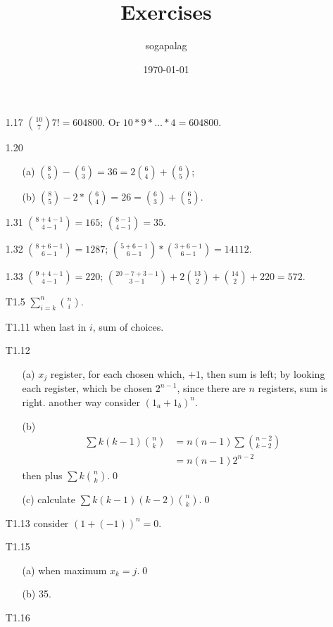 \documentclass[paper=a4, fontsize=11pt]{scrartcl} %
\title{Exercises}
\author{sogapalag}
\date{\normalsize\today}
\numberwithin{equation}{section} %
\numberwithin{figure}{section} %
\numberwithin{table}{section} %
\begin{document}
\maketitle
\begin{itemize}
	\item[1.17] ${10 \choose 7} 7! = 604800$. Or $10*9*\dots*4 = 604800$.
	\item[1.20] 
	\begin{itemize}
		\item[(a)] ${8\choose 5} - {6\choose 3} =36= 2{6\choose 4}+{6\choose 5}$; 
		\item[(b)] ${8\choose 5} - 2*{6\choose 4} =26= {6\choose 3} + {6\choose 5}$.
	\end{itemize}
	\item[1.31] ${8+4-1\choose 4-1} = 165$; ${8-1\choose 4-1}=35$.
	\item[1.32] ${8+6-1 \choose 6-1} = 1287$; ${5+6-1 \choose 6-1}*{3+6-1 \choose 6-1} = 14112$.
	\item[1.33] ${9+4-1 \choose 4-1} = 220$; ${20-7+3-1 \choose 3-1} +2{13\choose 2} +{14\choose 2} +220 = 572$.
	\item[T1.5] $\sum_{i=k}^n {n\choose i}$.
	\item[T1.11] when last in $i$, sum of choices.
	\item[T1.12]
	\begin{itemize}
		\item[(a)] $x_j$ register, for each chosen which, $+1$, then sum is left; by looking each register, which be chosen $2^{n-1}$, since there are $n$ registers, sum is right. another way consider $(1_a+1_b)^n$.
		\item[(b)]
		\begin{align}
			\sum k (k-1) {n\choose k } &= n(n-1) \sum {n-2 \choose k-2}\\
			&= n(n-1)2^{n-2}
		\end{align}
		then plus $\sum k{n\choose k}$.\qed
		\item[(c)] calculate $\sum k(k-1)(k-2){n\choose k}$.\qed
	\end{itemize}
	\item[T1.13] consider $(1+(-1))^n=0$.
	\item[T1.15]
	\begin{itemize}
		\item[(a)] when maximum $x_k = j$.\qed
		\item[(b)] 35.
	\end{itemize}
	\item[T1.16]

\end{itemize}
\end{document}
